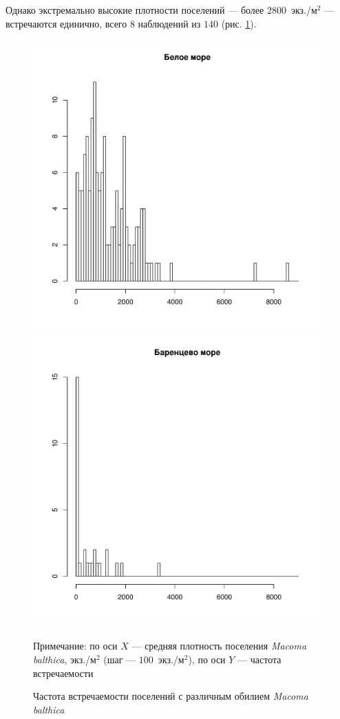 %
Однако экстремально высокие плотности поселений --- более $2800$~экз./м$^2$ --- встречаются единично, всего $8$ наблюдений из $140$ (рис. \ref{ris:Nmean_hist}).
%
	\begin{figure}[p]
		\includegraphics[height=.3\textheight]{../All_N/Nmean_hist_White1.pdf}
		\includegraphics[height=.3\textheight]{../All_N/Nmean_hist_Barents1.pdf}
	\caption{Частота встречаемости поселений с различным обилием {\it Macoma balthica}}
	{\footnotesize Примечание: по оси $X$ --- средняя плотность поселения {\it Macoma balthica}, экз./м$^2$ (шаг --- $100$~экз./м$^2$), по оси $Y$ 	--- частота встречаемости}
	\label{ris:Nmean_hist}
	\end{figure}
